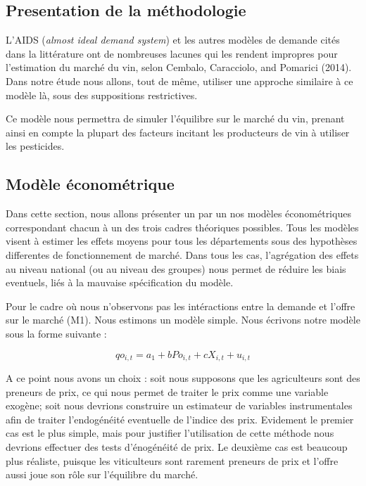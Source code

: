 \documentclass[11pt,]{article}
\begin{document}
\hypertarget{presentation-de-la-methodologie}{%
\subsection{Presentation de la
méthodologie}\label{presentation-de-la-methodologie}}

L'AIDS (\emph{almost ideal demand system}) et les autres modèles de
demande cités dans la littérature ont de nombreuses lacunes qui les
rendent impropres pour l'estimation du marché du vin, selon Cembalo,
Caracciolo, and Pomarici (2014). Dans notre étude nous allons, tout de
même, utiliser une approche similaire à ce modèle là, sous des
suppositions restrictives.

Ce modèle nous permettra de simuler l'équilibre sur le marché du vin,
prenant ainsi en compte la plupart des facteurs incitant les producteurs
de vin à utiliser les pesticides.

\hypertarget{modele-econometrique}{%
\subsection{Modèle économétrique}\label{modele-econometrique}}

Dans cette section, nous allons présenter un par un nos modèles
économétriques correspondant chacun à un des trois cadres théoriques
possibles. Tous les modèles visent à estimer les effets moyens pour tous
les départements sous des hypothèses differentes de fonctionnement de
marché. Dans tous les cas, l'agrégation des effets au niveau national
(ou au niveau des groupes) nous permet de réduire les biais eventuels,
liés à la mauvaise spécification du modèle.

Pour le cadre où nous n'observons pas les intéractions entre la demande
et l'offre sur le marché (M1). Nous estimons un modèle simple. Nous
écrivons notre modèle sous la forme suivante :

\begin{equation*}
  qo_{i,t} = a_1 + b Po_{i,t} + c X_{i,t} + u_{i,t}
\end{equation*}

A ce point nous avons un choix : soit nous supposons que les
agriculteurs sont des preneurs de prix, ce qui nous permet de traiter le
prix comme une variable exogène; soit nous devrions construire un
estimateur de variables instrumentales afin de traiter l'endogénéité
eventuelle de l'indice des prix. Evidement le premier cas est le plus
simple, mais pour justifier l'utilisation de cette méthode nous devrions
effectuer des tests d'énogénéité de prix. Le deuxième cas est beaucoup
plus réaliste, puisque les viticulteurs sont rarement preneurs de prix
et l'offre aussi joue son rôle sur l'équilibre du marché.
\end{document}
